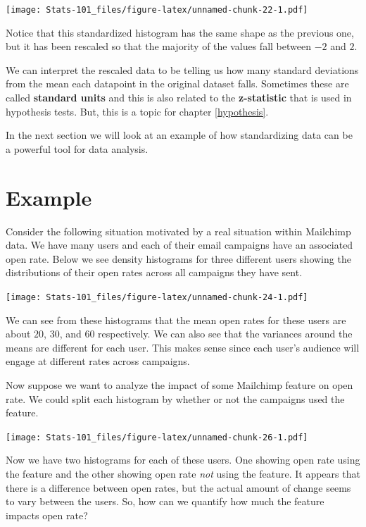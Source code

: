 \documentclass[]{book}
\begin{document}
\texttt{[image: Stats-101\_files/figure-latex/unnamed-chunk-22-1.pdf]}

Notice that this standardized histogram has the same shape as the previous one, but it has been rescaled so that the majority of the values fall between \(-2\) and \(2\).

We can interpret the rescaled data to be telling us how many standard deviations from the mean each datapoint in the original dataset falls. Sometimes these are called \textbf{standard units} and this is also related to the \textbf{z-statistic} that is used in hypothesis tests. But, this is a topic for chapter \ref{hypothesis}.

In the next section we will look at an example of how standardizing data can be a powerful tool for data analysis.

\hypertarget{example}{%
\section{Example}\label{example}}

Consider the following situation motivated by a real situation within Mailchimp data. We have many users and each of their email campaigns have an associated open rate. Below we see density histograms for three different users showing the distributions of their open rates across all campaigns they have sent.

\texttt{[image: Stats-101\_files/figure-latex/unnamed-chunk-24-1.pdf]}

We can see from these histograms that the mean open rates for these users are about \(20\), \(30\), and \(60\) respectively. We can also see that the variances around the means are different for each user. This makes sense since each user's audience will engage at different rates across campaigns.

Now suppose we want to analyze the impact of some Mailchimp feature on open rate. We could split each histogram by whether or not the campaigns used the feature.

\texttt{[image: Stats-101\_files/figure-latex/unnamed-chunk-26-1.pdf]}

Now we have two histograms for each of these users. One showing open rate using the feature and the other showing open rate \emph{not} using the feature. It appears that there is a difference between open rates, but the actual amount of change seems to vary between the users. So, how can we quantify how much the feature impacts open rate?
\end{document}
